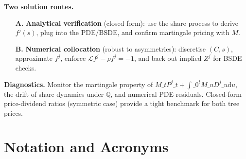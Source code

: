 ﻿\documentclass[11pt,letterpaper,oneside]{article}
\numberwithin{equation}{section}
\newcommand{\1}{\mathbf{1}}
\newcommand{\diff}{\mathrm{d}}
\begin{document}
\begin{tcolorbox}[didacticstyle]
\textbf{Two solution routes.}
\begin{enumerate}[leftmargin=1.25em]
\item[\textbf{A.}] \textbf{Analytical verification} (closed form): use the share process to derive $f^j(s)$, plug into the PDE/BSDE, and confirm martingale pricing with $M$.
\item[\textbf{B.}] \textbf{Numerical collocation} (robust to asymmetries): discretise $(C,s)$, approximate $f^j$, enforce $\mathcal{L}f^j-\rho f^j=-1$, and back out implied $Z^j$ for BSDE checks.
\end{enumerate}

\textbf{Diagnostics.} Monitor the martingale property of $M\_t P^j\_t+\int\_0^t M\_u D^j\_u\diff u$, the drift of share dynamics under $\mathbb{Q}$, and numerical PDE residuals. Closed-form price-dividend ratios (symmetric case) provide a tight benchmark for both tree prices.
\end{tcolorbox}
 
 

\newpage
\clearpage
\section{Notation and Acronyms}
\end{document}
